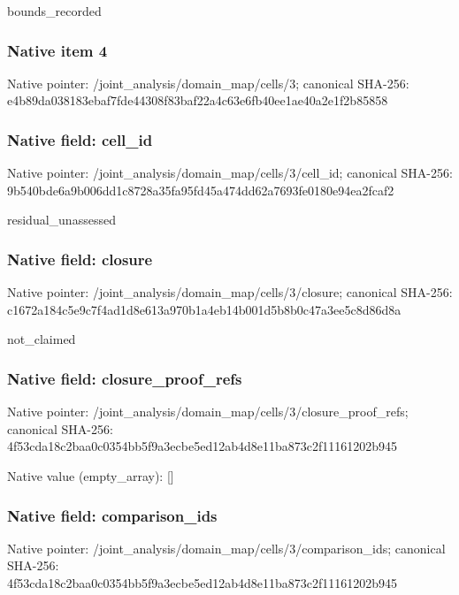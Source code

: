 \documentclass[10pt,a4paper]{article}
\begin{document}
\begingroup\raggedright\sloppy bounds\_\allowbreak{}recorded\par\endgroup

\subsubsection{Native item 4}
Native pointer: /joint\_\allowbreak{}analysis/domain\_\allowbreak{}map/cells/3; canonical SHA-256: e4b89da038183ebaf7fde44308f83baf22a4c63e6fb40ee1ae40a2e1f2b85858

\subsubsection{Native field: cell\_\allowbreak{}id}
Native pointer: /joint\_\allowbreak{}analysis/domain\_\allowbreak{}map/cells/3/cell\_\allowbreak{}id; canonical SHA-256: 9b540bde6a9b006dd1c8728a35fa95fd45a474dd62a7693fe0180e94ea2fcaf2

\begingroup\raggedright\sloppy residual\_\allowbreak{}unassessed\par\endgroup

\subsubsection{Native field: closure}
Native pointer: /joint\_\allowbreak{}analysis/domain\_\allowbreak{}map/cells/3/closure; canonical SHA-256: c1672a184c5e9c7f4ad1d8e613a970b1a4eb14b001d5b8b0c47a3ee5c8d86d8a

\begingroup\raggedright\sloppy not\_\allowbreak{}claimed\par\endgroup

\subsubsection{Native field: closure\_\allowbreak{}proof\_\allowbreak{}refs}
Native pointer: /joint\_\allowbreak{}analysis/domain\_\allowbreak{}map/cells/3/closure\_\allowbreak{}proof\_\allowbreak{}refs; canonical SHA-256: 4f53cda18c2baa0c0354bb5f9a3ecbe5ed12ab4d8e11ba873c2f11161202b945

Native value (empty\_\allowbreak{}array): []

\subsubsection{Native field: comparison\_\allowbreak{}ids}
Native pointer: /joint\_\allowbreak{}analysis/domain\_\allowbreak{}map/cells/3/comparison\_\allowbreak{}ids; canonical SHA-256: 4f53cda18c2baa0c0354bb5f9a3ecbe5ed12ab4d8e11ba873c2f11161202b945
\end{document}
